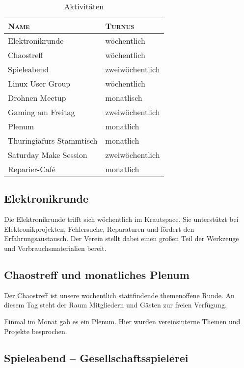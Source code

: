\documentclass[ngerman]{scrartcl}
\begin{document}
\begin{table}[h]
  \centering{}
	\begin{tabularx}{\textwidth}{l|X}
          \toprule
		\textsc{Name} & \textsc{Turnus} \\ \midrule
		Elektronikrunde   & wöchentlich \\
		Chaostreff        & wöchentlich \\
		Spieleabend       & zweiwöchentlich \\
		Linux User Group  & wöchentlich \\
                Drohnen Meetup    & monatlisch \\
		Gaming am Freitag & zweiwöchentlich \\
                Plenum            & monatlich \\
		Thuringiafurs Stammtisch & monatlich \\
		Saturday Make Session    & zweiwöchentlich \\
		Reparier-Café     & monatlich \\
\bottomrule
\end{tabularx}

\caption{Aktivitäten}
\end{table}

\subsection{Elektronikrunde}

Die Elektronikrunde trifft sich wöchentlich im Krautspace.
Sie unterstützt bei Elektronikprojekten, Fehlersuche,
Reparaturen und fördert den Erfahrungsaustausch.
Der Verein stellt dabei einen großen Teil der Werkzeuge und
Verbrauchsmaterialien bereit.

\subsection{Chaostreff und monatliches Plenum}

Der Chaostreff ist unsere wöchentlich stattfindende themenoffene Runde.
An diesem Tag steht der Raum Mitgliedern und Gästen zur freien Verfügung.

Einmal im Monat gab es ein Plenum. Hier wurden vereinsinterne Themen und Projekte besprochen.

\subsection{Spieleabend -- Gesellschaftsspielerei}
\end{document}

